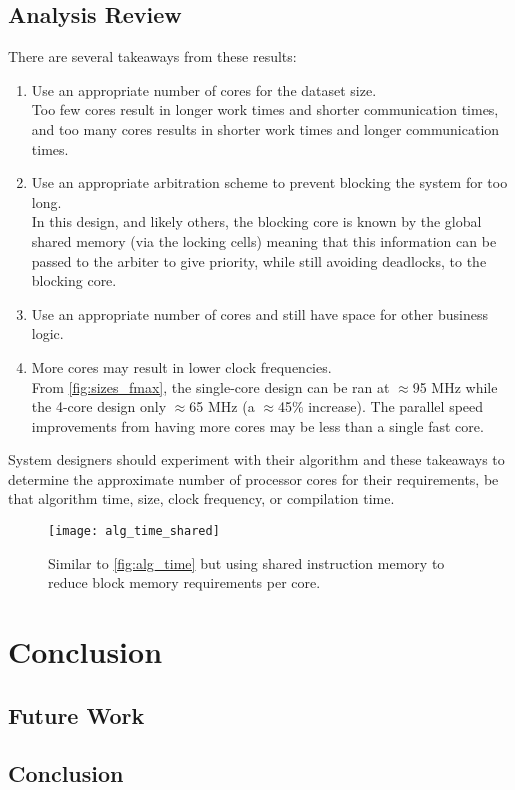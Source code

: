 \section{Analysis Review}
There are several takeaways from these results:
\begin{enumerate}
\item Use an appropriate number of cores for the dataset size.\\Too few cores result in longer work times and shorter communication times, and too many cores results in shorter work times and longer communication times.

\item Use an appropriate arbitration scheme to prevent blocking the system for too long.\\
In this design, and likely others, the blocking core is known by the global shared memory (via the locking cells) meaning that this information can be passed to the arbiter to give priority, while still avoiding deadlocks, to the blocking core.

\item Use an appropriate number of cores and still have space for other business logic.

\item More cores may result in lower clock frequencies.\\From \cref{fig:sizes_fmax}, the single-core design can be ran at $\approx$95 MHz while the 4-core design only $\approx$65 MHz (a $\approx$45\% increase). The parallel speed improvements from having more cores may be less than a single fast core.
\end{enumerate}

System designers should experiment with their algorithm and these takeaways to determine the approximate number of processor cores for their requirements, be that algorithm time, size, clock frequency, or compilation time.

\begin{figure}[h]
\centering
\texttt{[image: alg\_time\_shared]}
\caption{Similar to \cref{fig:alg_time} but using shared instruction memory to reduce block memory requirements per core.}
\label{fig:alg_time_shared}
\end{figure}



\chapter{Conclusion}
\section{Future Work}
\section{Conclusion}















